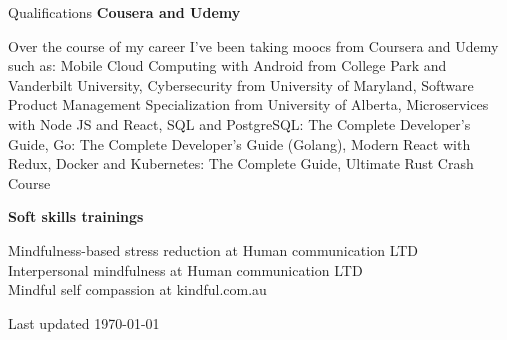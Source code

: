 \documentclass{resume}
\begin{document}
\begin{rSection}{Qualifications}
        {\bf Cousera and Udemy}

        Over the course of my career I've been taking moocs from Coursera and Udemy such as:
        Mobile Cloud Computing with Android from College Park and Vanderbilt University,
        Cybersecurity from University of Maryland,
        Software Product Management Specialization from University of Alberta,
        Microservices with Node JS and React,
        SQL and PostgreSQL: The Complete Developer's Guide,
        Go: The Complete Developer's Guide (Golang),
        Modern React with Redux,
        Docker and Kubernetes: The Complete Guide,
        Ultimate Rust Crash Course

            {\bf Soft skills trainings}

        Mindfulness-based stress reduction at Human communication LTD\\
        Interpersonal mindfulness at Human communication LTD\\
        Mindful self compassion at kindful.com.au\\
    \end{rSection}


    \begin{rSection}{}
        Last updated \today
    \end{rSection}
\end{document}

